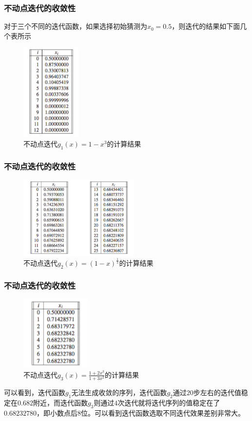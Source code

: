 \documentclass[10pt]{beamer}
\begin{document}
\begin{frame}
\frametitle{不动点迭代的收敛性}
对于三个不同的迭代函数，如果选择初始猜测为$x_0 = 0.5$，则迭代的结果如下面几个表所示
\begin{figure}
\includegraphics[width=3cm]{figs/FPI_g1_results.png} 
\caption{不动点迭代$g_1(x) = 1- x^3$的计算结果} 
\end{figure}

\end{frame}

\begin{frame}
\frametitle{不动点迭代的收敛性}
\begin{figure}
\includegraphics[width=6cm]{figs/FPI_g2_results.png} 
\caption{不动点迭代$g_2(x) = (1-x)^{\frac{1}{3}}$的计算结果} 
\end{figure}

\end{frame}

\begin{frame}
\frametitle{不动点迭代的收敛性}
\begin{figure}
\includegraphics[width=3.5cm]{figs/FPI_g3_results.png} 
\caption{不动点迭代$g_3(x) =  \frac{1+2x^3}{1+3x^2}$的计算结果} 
\end{figure}

可以看到，迭代函数$g_1$无法生成收敛的序列，迭代函数$g_2$通过$20$步左右的迭代值稳定在$0.682$附近，而迭代函数$g_3$则通过$4$次迭代就将迭代序列的值稳定在了$0.68232780$，即小数点后$8$位。可以看到迭代函数选取不同迭代效果差别非常大。
\end{frame}
\end{document}
